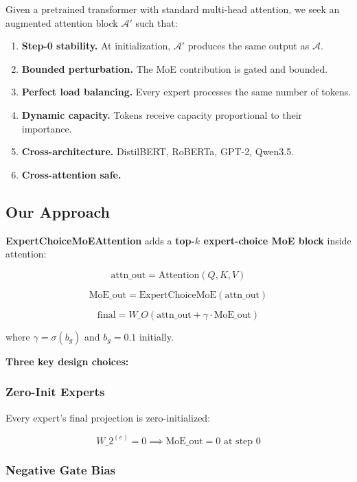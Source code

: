 Given a pretrained transformer with standard multi-head attention, we seek 
an augmented attention block $\mathcal{A}'$ such that:

\begin{enumerate}
\item \textbf{Step-0 stability.} At initialization, $\mathcal{A}'$ produces the
  same output as $\mathcal{A}$.
\item \textbf{Bounded perturbation.} The MoE contribution is gated and bounded.
\item \textbf{Perfect load balancing.} Every expert processes the same number of
  tokens.
\item \textbf{Dynamic capacity.} Tokens receive capacity proportional to their
  importance.
\item \textbf{Cross-architecture.} DistilBERT, RoBERTa, GPT-2, Qwen3.5.
\item \textbf{Cross-attention safe.}

\end{enumerate}
\subsection{Our Approach}

\textbf{ExpertChoiceMoEAttention} adds a \textbf{top-$k$ expert-choice MoE block} 
inside attention:

\[
\text{attn\_out} = \text{Attention}(Q, K, V)
\tag{1.1}
\]

\[
\text{MoE\_out} = \text{ExpertChoiceMoE}(\text{attn\_out})
\tag{1.2}
\]

\[
\text{final} = W\_O \left( \text{attn\_out} + \gamma \cdot \text{MoE\_out} \right)
\tag{1.3}
\]

where $\gamma = \sigma(b_g)$ and $b_g = 0.1$ initially.

\textbf{Three key design choices:}

\subsubsection{Zero-Init Experts}

Every expert's final projection is zero-initialized:

\[
W\_2^{(e)} = 0 \implies \text{MoE\_out} = 0 \text{ at step 0}
\tag{1.4}
\]

\subsubsection{Negative Gate Bias}

